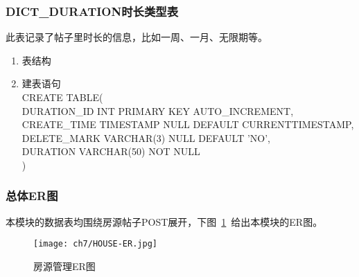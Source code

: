 \subsubsection{DICT\_DURATION时长类型表}
此表记录了帖子里时长的信息，比如一周、一月、无限期等。
\begin{enumerate}
    \item 表结构
    \begin{table}[htbp]
        \centering
        \end{table}
    \item 建表语句\\
        CREATE TABLE(\\
            DURATION\_ID INT PRIMARY KEY AUTO\_INCREMENT,\\
            CREATE\_TIME TIMESTAMP NULL DEFAULT CURRENTTIMESTAMP,\\
            DELETE\_MARK VARCHAR(3) NULL DEFAULT 'NO',\\
            DURATION VARCHAR(50) NOT NULL\\
        )
    \end{enumerate}


\subsubsection{总体ER图}
本模块的数据表均围绕房源帖子POST展开，下图~\ref{fig:HOUSE-ER}~给出本模块的ER图。
\begin{figure}[htbp]
    \centering
    \texttt{[image: ch7/HOUSE-ER.jpg]}
    \caption{房源管理ER图}\label{fig:HOUSE-ER}
    \vspace{\baselineskip} %
\end{figure}

